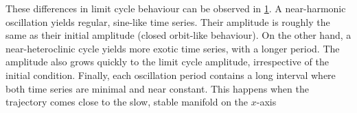 \begin{figure}
\label{fig:lc_sims}
\end{figure}

These differences in limit cycle behaviour can be observed in \cref{fig:lc_sims}. A near-harmonic oscillation yields regular, sine-like time series. Their amplitude is roughly the same as their initial amplitude (closed orbit-like behaviour). On the other hand, a near-heteroclinic cycle yields more exotic time series, with a longer period. The amplitude also grows quickly to the limit cycle amplitude, irrespective of the initial condition. Finally, each oscillation period contains a long interval where both time series are minimal and near constant. This happens when the trajectory comes close to the slow, stable manifold on the $x$-axis
